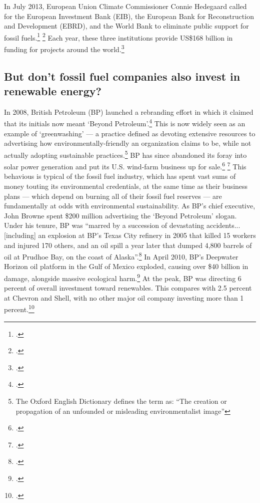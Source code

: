 In July 2013, European Union Climate Commissioner Connie Hedegaard called for the European Investment Bank (EIB), the European Bank for Reconstruction and Development (EBRD), and the World Bank to eliminate public support for fossil fuels.\footcite[][p. 9--10]{InvestHasteRepent} \footcite[See also:][]{HedegaardAppeal}
Each year, these three institutions provide US\$168 billion in funding for projects around the world.\footcite[][p. 10]{InvestHasteRepent}


	
	\subsection{But don't fossil fuel companies also invest in renewable energy?}
	\label{RenewableInvest}



In 2008, British Petroleum (BP) launched a rebranding effort in which it claimed that its initials now meant `Beyond Petroleum'.\footcite[][]{GreenwashBP}
This is now widely seen as an example of `greenwashing' --- a practice defined as devoting extensive resources to advertising how environmentally-friendly an organization claims to be, while not actually adopting sustainable practices.\footnote{The Oxford English Dictionary defines the term as: ``The creation or propagation of an unfounded or misleading environmentalist image''}
BP has since abandoned its foray into solar power generation and put its U.S. wind-farm business up for sale.\footcite[][]{BPNoLongerBeyond} \footcite[][]{BPNoMore}
This behavious is typical of the fossil fuel industry, which has spent vast sums of money touting its environmental credentials, at the same time as their business plans --- which depend on burning all of their fossil fuel reserves --- are fundamentally at odds with environmental sustainability.
As BP's chief executive, John Browne spent \$200 million advertising the `Beyond Petroleum' slogan.
Under his tenure, BP was ``marred by a succession of devastating accidents... [including] an explosion at BP's Texas City refinery in 2005 that killed 15 workers and injured 170 others, and an oil spill a year later that dumped 4,800 barrels of oil at Prudhoe Bay, on the coast of Alaska''.\footcite[][]{BlackStuffBP}
In April 2010, BP's Deepwater Horizon oil platform in the Gulf of Mexico exploded, causing over \$40 billion in damage, alongside massive ecological harm.\footcite[][]{OffshoreLiability}
At the peak, BP was directing 6 percent of overall investment toward renewables.
This compares with 2.5 percent at Chevron and Shell, with no other major oil company investing more than 1 percent.\footcite[][]{RSBigOilLies}



